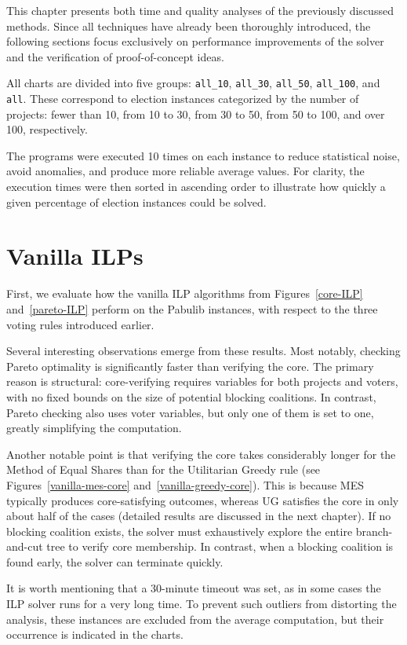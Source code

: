 \documentclass[magisterska,en]{pracamgr}
\begin{document}
This chapter presents both time and quality analyses of the previously discussed methods. Since all techniques have already been thoroughly introduced, the following sections focus exclusively on performance improvements of the solver and the verification of proof-of-concept ideas.

All charts are divided into five groups: \texttt{all\_10}, \texttt{all\_30}, \texttt{all\_50}, \texttt{all\_100}, and \texttt{all}. These correspond to election instances categorized by the number of projects: fewer than 10, from 10 to 30, from 30 to 50, from 50 to 100, and over 100, respectively.

The programs were executed 10 times on each instance to reduce statistical noise, avoid anomalies, and produce more reliable average values. For clarity, the execution times were then sorted in ascending order to illustrate how quickly a given percentage of election instances could be solved.

\section{Vanilla ILPs}

First, we evaluate how the vanilla ILP algorithms from Figures~\ref{core-ILP} and~\ref{pareto-ILP} perform on the Pabulib instances, with respect to the three voting rules introduced earlier.

Several interesting observations emerge from these results. Most notably, checking Pareto optimality is significantly faster than verifying the core. The primary reason is structural: core-verifying requires variables for both projects and voters, with no fixed bounds on the size of potential blocking coalitions. In contrast, Pareto checking also uses voter variables, but only one of them is set to one, greatly simplifying the computation.

Another notable point is that verifying the core takes considerably longer for the Method of Equal Shares than for the Utilitarian Greedy rule (see Figures~\ref{vanilla-mes-core} and~\ref{vanilla-greedy-core}). This is because MES typically produces core-satisfying outcomes, whereas UG satisfies the core in only about half of the cases (detailed results are discussed in the next chapter). If no blocking coalition exists, the solver must exhaustively explore the entire branch-and-cut tree to verify core membership. In contrast, when a blocking coalition is found early, the solver can terminate quickly.

It is worth mentioning that a 30-minute timeout was set, as in some cases the ILP solver runs for a very long time. To prevent such outliers from distorting the analysis, these instances are excluded from the average computation, but their occurrence is indicated in the charts.
\end{document}
